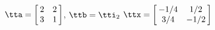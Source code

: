 {$\tta = \left[\hskip -3pt \begin{array}{cc} 2&2 \\    3&1  \end{array}\hskip -3pt \right] $,  \quad
$\ttb=\tti_2 $}
{$\ttx=\left[\hskip -3pt \begin{array}{cc} -1/4 & 1/2 \\    3/4 & -1/2  \end{array}\hskip -3pt \right] $}
